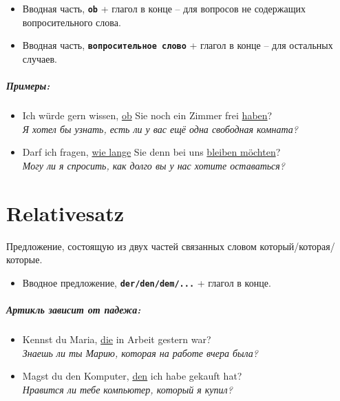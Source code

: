 \documentclass[12pt,a4paper]{report}
\newcommand{\term}[1]{\texttt{\textbf{#1}}}
\newcommand{\satzew}[1]{\underline{#1}}
\newcommand{\ubersatze}[1]{\textit{#1}}
\begin{document}
\begin{itemize}
 \item Вводная часть, \term{ob} + глагол в конце -- для вопросов не содержащих вопросительного слова.
 \item Вводная часть, \term{вопросительное слово} + глагол в конце -- для остальных случаев.
\end{itemize}

\paragraph{Примеры:}
\begin{itemize}
 \item Ich würde gern wissen, \satzew{ob} Sie noch ein Zimmer frei \satzew{haben}?
 ~\\ \ubersatze{Я хотел бы узнать, есть ли у вас ещё одна свободная комната?}
 \item Darf ich fragen, \satzew{wie lange} Sie denn bei uns \satzew{bleiben möchten}?
 ~\\ \ubersatze{Могу ли я спросить, как долго вы у нас хотите оставаться?}
\end{itemize}


\newpage

\chapter{Relativesatz}

Предложение, состоящую из двух частей связанных словом который/которая/которые.

\begin{itemize}
 \item Вводное предложение, \term{der/den/dem/...} + глагол в конце.
\end{itemize}

\paragraph{Артикль зависит от падежа:}
\begin{itemize}
 \item Kennst du Maria, \satzew{die} in Arbeit gestern war?
 ~\\ \ubersatze{Знаешь ли ты Марию, которая на работе вчера была?}
 \item Magst du den Komputer, \satzew{den} ich habe gekauft hat?
 ~\\ \ubersatze{Нравится ли тебе компьютер, который я купил?}
\end{itemize}
\end{document}
